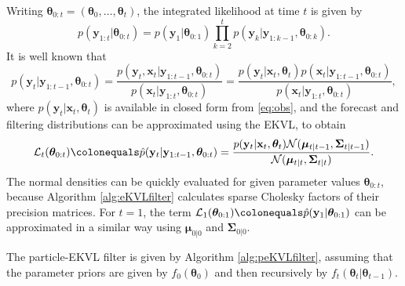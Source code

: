\documentclass[12pt,letterpaper]{article}
\theoremstyle{propstyle}
\theoremstyle{propstyle}
\theoremstyle{propstyle}
\theoremstyle{propstyle}
\theoremstyle{propstyle}
\newcommand{\bx}{\mathbf{x}}
\newcommand{\by}{\mathbf{y}}
\newcommand{\bfmu}{\bm{\mu}}
\newcommand{\bftheta}{\bm{\theta}}
\newcommand{\bfSigma}{\bm{\Sigma}}
\newcommand{\normal}{\mathcal{N}}
\begin{document}
Writing $\bftheta_{0:t} = (\bftheta_0, \ldots, \bftheta_t)$, the integrated likelihood at time $t$ is given by
\begin{equation}
\textstyle p(\by_{1:t}|\bftheta_{0:t}) = p(\by_1 | \bftheta_{0:1})\prod_{k=2}^t p(\by_{k}|\by_{1:k-1}, \bftheta_{0:k}).
\label{eq:int-lik-approx}
\end{equation}
It is well known that
\begin{equation}
p(\by_{t}|\by_{1:t-1}, \bftheta_{0:t}) = 
    \frac{p(\by_t, \bx_t | \by_{1:t-1},\bftheta_{0:t})}{p(\bx_t|\by_{1:t},\bftheta_{0:t})} = 
    \frac{p(\by_t | \bx_t,\bftheta_{t}) p(\bx_t|\by_{1:t-1},\bftheta_{0:t})}{ p(\bx_t|\by_{1:t},\bftheta_{0:t})},
    \label{eq:lik-decom}
\end{equation}
where $p(\by_t | \bx_t,\bftheta_{t})$ is available in closed form from \eqref{eq:obs}, and the forecast and filtering distributions can be approximated using the EKVL, to obtain
\begin{equation}
    \mathcal{L}_t(\bftheta_{0:t}) \colonequals \hat p(\by_{t}|\by_{1:t-1}, \bftheta_{0:t})  = \frac{p(\by_t | \bx_t,\bftheta_{t})\normal(\bfmu_{t|t-1}, \bfSigma_{t|t-1})}{\normal(\bfmu_{t|t}, \bfSigma_{t|t})}.
\label{eq:approximate-yAR}
\end{equation}
The normal densities can be quickly evaluated for given parameter values $\bftheta_{0:t}$, because Algorithm \ref{alg:eKVLfilter} calculates sparse Cholesky factors of their precision matrices. For $t=1$, the term $\mathcal{L}_1(\bftheta_{0:1}) \colonequals \hat p(\by_1|\bftheta_{0:1})$ can be approximated in a similar way using $\bfmu_{0|0}$ and $\bfSigma_{0|0}$.

The particle-EKVL filter is given by Algorithm \ref{alg:peKVLfilter}, assuming that the parameter priors are given by $f_0(\bftheta_0)$ and then recursively by $f_t(\bftheta_t|\bftheta_{t-1})$.
\end{document}
